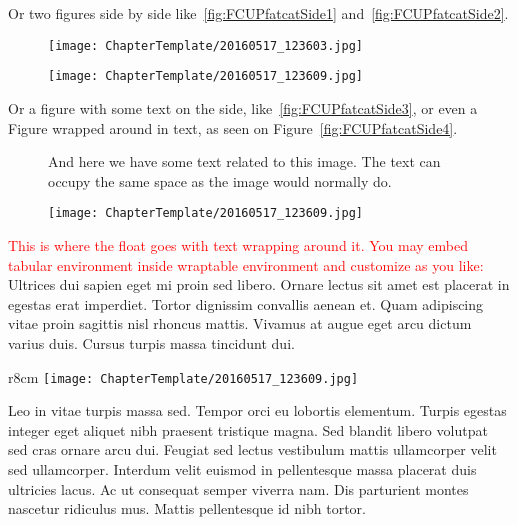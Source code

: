 Or two figures side by side like~\ref{fig:FCUPfatcatSide1}
and~\ref{fig:FCUPfatcatSide2}.

\begin{figure}
\centering
\begin{minipage}{.49\textwidth}
  \centering
  \texttt{[image: ChapterTemplate/20160517\_123603.jpg]}
\end{minipage}%
\hfill
\begin{minipage}{.49\textwidth}
  \centering
  \texttt{[image: ChapterTemplate/20160517\_123609.jpg]}
\end{minipage}
\end{figure}


Or a figure with some text on the side, like~\ref{fig:FCUPfatcatSide3}, or even
a Figure wrapped around in text, as seen on Figure~\ref{fig:FCUPfatcatSide4}.

\begin{figure}
\centering
\begin{minipage}{.49\textwidth}
  And here we have some text related to this image. The text can occupy the same space as the image would normally do.
\end{minipage}%
\hfill
\begin{minipage}{.49\textwidth}
  \centering
  \texttt{[image: ChapterTemplate/20160517\_123609.jpg]}
\end{minipage}
\end{figure}

\textcolor{red}{This is where the float goes with text wrapping around it. You
may embed tabular environment inside wraptable environment and customize as you
like:} Ultrices dui sapien eget mi proin sed libero. Ornare lectus sit amet est
placerat in egestas erat imperdiet. Tortor dignissim convallis aenean et. Quam
adipiscing vitae proin sagittis nisl rhoncus mattis. Vivamus at augue eget arcu
dictum varius duis. Cursus turpis massa tincidunt dui.
\begin{wrapfigure}{r}{8cm}
    \centering
    \texttt{[image: ChapterTemplate/20160517\_123609.jpg]}
  \end{wrapfigure}
Leo in vitae turpis massa sed. Tempor orci eu lobortis elementum. Turpis egestas
integer eget aliquet nibh praesent tristique magna. Sed blandit libero volutpat
sed cras ornare arcu dui. Feugiat sed lectus vestibulum mattis ullamcorper velit
sed ullamcorper. Interdum velit euismod in pellentesque massa placerat duis
ultricies lacus. Ac ut consequat semper viverra nam. Dis parturient montes
nascetur ridiculus mus. Mattis pellentesque id nibh tortor.

